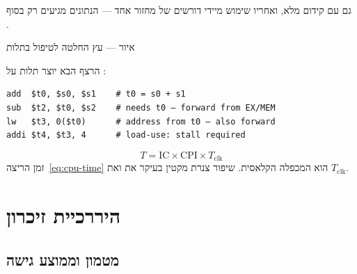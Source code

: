 \begin{warnbox}[frametitle={מלכודת — \code{load-use}}]
גם עם קידום מלא,  ואחריו שימוש מיידי דורשים  של מחזור אחד —
הנתונים מגיעים רק בסוף .
\end{warnbox}

\begin{tikzpic}
\end{tikzpic}
\begin{center}\small איור — עץ החלטה לטיפול בתלות\end{center}

\begin{exbox}[frametitle={דוגמה — רצף עם תלות}]
הרצף הבא יוצר תלות  על :
\begin{asmblock}
\begin{lstlisting}[style=asm]
add  $t0, $s0, $s1    # t0 = s0 + s1
sub  $t2, $t0, $s2    # needs t0 — forward from EX/MEM
lw   $t3, 0($t0)      # address from t0 — also forward
addi $t4, $t3, 4      # load-use: stall required
\end{lstlisting}
\end{asmblock}
\end{exbox}

\begin{equation}
\label{eq:cpu-time}
T = \mathrm{IC}\times\mathrm{CPI}\times T_{\mathrm{clk}}
\end{equation}
זמן הריצה~\eqref{eq:cpu-time} הוא המכפלה הקלאסית. שיפור צנרת מקטין בעיקר את 
ואת $T_{\mathrm{clk}}$.

\part{היררכיית זיכרון}

\chapter{מטמון וממוצע גישה}
\label{ch:cache}

